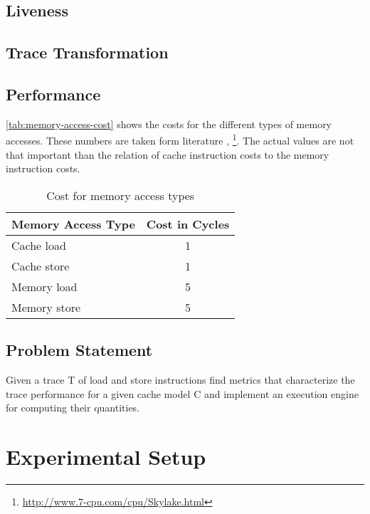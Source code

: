 \documentclass[onecolumn, openany, master, english, seal, signatures]{dbrgrptt}
\begin{document}
\section{Liveness}\label{sec:liveness}

\section{Trace Transformation}\label{sec:trace-transformation}

\section{Performance}\label{sec:performance}

\autoref{tab:memory-access-cost} shows the costs for the different types of memory accesses. These numbers are taken form literature \cite{drepper2007every}, \footnote{\url{http://www.7-cpu.com/cpu/Skylake.html}}. The actual values are not that important than the relation of cache instruction costs to the memory instruction costs.
\begin{table}
  \centering
  \begin{tabular}{lc}
  \hline
  Memory Access Type & Cost in Cycles \\
  \hline
  Cache  load  & 1 \\
  Cache  store & 1 \\
  Memory load  & 5 \\
  Memory store & 5 \\
  \hline
  \end{tabular}
  \caption{Cost for memory access types}
  \label{tab:memory-access-cost}
\end{table}

\section{Problem Statement}
Given a trace T of load and store instructions find metrics that characterize the trace performance for a given cache model C and implement an execution engine for computing their quantities.

\chapter{Experimental Setup}
\end{document}
